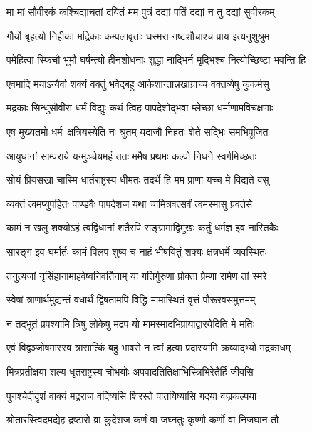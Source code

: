 \twolineshloka
{मा मां सौवीरकं कश्चिद्याचतां दयितं मम}
{पुत्रं दद्यां पतिं दद्यां न तु दद्यां सुवीरकम्}


\twolineshloka
{गौर्यो बृहत्यो निर्हीका मद्रिकाः कम्पलावृताः}
{घस्मरा नष्टशौचाश्च प्राय इत्यनुशुश्रुम}


\twolineshloka
{पमेहित्वा स्फिचौ भूमौ घर्षन्त्यो हीनशोधनाः}
{शुद्धा नाद्भिर्न मृद्भिश्च नित्योच्छिष्टा भवन्ति हि}


\twolineshloka
{एवमादि मयाऽन्यैर्वा शक्यं वक्तुं भवेद्बहु}
{आकेशान्तान्नखाग्राच्च वक्तव्येषु कुकर्मसु}


\twolineshloka
{मद्रकाः सिन्धुसौवीरा धर्मं विद्युः कथं त्विह}
{पापदेशोद्भवा म्लेच्छा धर्माणामविचक्षणाः}


\twolineshloka
{एष मुख्यतमो धर्मः क्षत्रियस्येति नः श्रुतम्}
{यदाजौ निहतः शेते सद्भिः समभिपूजितः}


\twolineshloka
{आयुधानां साम्पराये यन्मुञ्चेयमहं ततः}
{ममैष प्रथमः कल्पो निधने स्वर्गमिच्छतः}


\twolineshloka
{सोयं प्रियसखा चास्मि धार्तराष्ट्रस्य धीमतः}
{तदर्थे हि मम प्राणा यच्च मे विद्यते वसु}


\twolineshloka
{व्यक्तं त्वमप्युपहितः पाण्डवैः पापदेशज}
{यथा चामित्रवत्सर्वं त्वमस्मासु प्रवर्तसे}


\twolineshloka
{कामं न खलु शक्योऽहं त्वद्विधानां शतैरपि}
{सङ्ग्रामाद्विमुखः कर्तुं धर्मज्ञ इव नास्तिकैः}


\twolineshloka
{सारङ्ग इव घर्मार्तः कामं विलप शुष्य च}
{नाहं भीषयितुं शक्यः क्षत्रधर्मे व्यवस्थितः}


\twolineshloka
{तनुत्यजां नृसिंहानामाहवेष्वनिवर्तिनाम्}
{या गतिर्गुरुणा प्रोक्ता प्रेम्णा रामेण तां स्मरे}


\twolineshloka
{स्वेषां त्राणार्थमुद्यन्तं वधार्थं द्विषतामपि}
{विद्धि मामास्थितं वृत्तं पौरूरवसमुत्तमम्}


\twolineshloka
{न तद्भूतं प्रपश्यामि त्रिषु लोकेषु मद्रप}
{यो मामस्मादभिप्रायाद्वारयेदिति मे मतिः}


\twolineshloka
{एवं विद्वञ्जोषमास्स्व त्रासात्किं बहु भाषसे}
{न त्वां हत्वा प्रदास्यामि क्रव्याद्भ्यो मद्रकाधम्}


\twolineshloka
{मित्रप्रतीक्षया शल्य धृतराष्ट्रस्य चोभयोः}
{अपवादतितिक्षाभिस्त्रिभिरेतैर्हि जीवसि}


\twolineshloka
{पुनश्चेदीदृशं वाक्यं मद्रराज वदिष्यसि}
{शिरस्ते पातयिष्यासि गदया वज्रकल्पया}


\twolineshloka
{श्रोतारस्त्विदमद्येह द्रष्टारो व्रा कुदेशज}
{कर्णं वा जघ्नतुः कृष्णौ कर्णो वा निजघान तौ}



